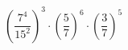 \begin{ex}[type=calculate]
	\begin{condition}
		\( \left( \dfrac{7^4}{15^2} \right)^3\cdot\left( \dfrac{5}{7} \right)^6\cdot\left( \dfrac{3}{7} \right)^5 \)
	\end{condition}
\end{ex}